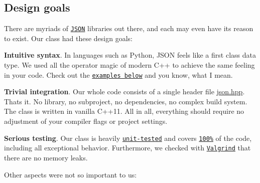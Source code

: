 

\href{https://travis-ci.org/nlohmann/json}{\tt } \href{https://ci.appveyor.com/project/nlohmann/json}{\tt } \href{https://coveralls.io/r/nlohmann/json}{\tt } \href{http://melpon.org/wandbox/permlink/wuiuqYiYqRTdI3rG}{\tt } \href{http://nlohmann.github.io/json}{\tt } \href{https://raw.githubusercontent.com/nlohmann/json/master/LICENSE.MIT}{\tt } \href{https://github.com/nlohmann/json/releases}{\tt } \href{http://github.com/nlohmann/json/issues}{\tt }

\subsection*{Design goals}

There are myriads of \href{http://json.org}{\tt J\+S\+ON} libraries out there, and each may even have its reason to exist. Our class had these design goals\+:


\begin{DoxyItemize}
\item {\bfseries Intuitive syntax}. In languages such as Python, J\+S\+ON feels like a first class data type. We used all the operator magic of modern C++ to achieve the same feeling in your code. Check out the \href{#examples}{\tt examples below} and you know, what I mean.
\item {\bfseries Trivial integration}. Our whole code consists of a single header file {\ttfamily \hyperlink{a00257_source}{json.\+hpp}}. That\textquotesingle{}s it. No library, no subproject, no dependencies, no complex build system. The class is written in vanilla C++11. All in all, everything should require no adjustment of your compiler flags or project settings.
\item {\bfseries Serious testing}. Our class is heavily \href{https://github.com/nlohmann/json/blob/master/test/json_unit.cc}{\tt unit-\/tested} and covers \href{https://coveralls.io/r/nlohmann/json}{\tt 100\%} of the code, including all exceptional behavior. Furthermore, we checked with \href{http://valgrind.org}{\tt Valgrind} that there are no memory leaks.
\end{DoxyItemize}

Other aspects were not so important to us\+:


